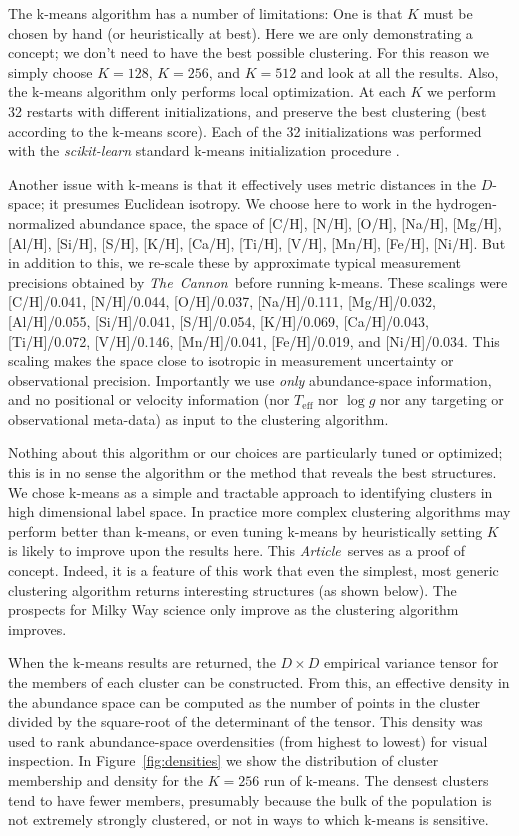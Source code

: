 \documentclass[manuscript, letterpaper]{aastex6}
\newcommand{\project}[1]{\textsl{#1}}
\newcommand{\thecannon}{\project{The~Cannon}}
\newcommand{\documentname}{\textsl{Article}}
\renewcommand{\figurename}{Figure} %
\newcommand{\teff}{T_{\mathrm{eff}}}
\newcommand{\logg}{\log g}
\begin{document}
The k-means algorithm has a number of limitations:
One is that $K$ must be chosen by hand (or heuristically at best).
Here we are only demonstrating a concept; we don't need to have the
best possible clustering.
For this reason we simply choose $K=128$, $K=256$, and $K=512$ and look at all the
results.
Also, the k-means algorithm only performs local optimization.
At each $K$ we perform 32 restarts with different initializations, and
preserve the best clustering (best according to the k-means score).
Each of the 32 initializations was performed with the
\project{scikit-learn} standard k-means initialization procedure
\citep{sklearn}.

Another issue with k-means is that it effectively uses metric
distances in the $D$-space; it presumes Euclidean isotropy.
We choose here to work in the hydrogen-normalized abundance space, the
space of [C/H], [N/H], [O/H], [Na/H], [Mg/H], [Al/H], [Si/H], [S/H],
[K/H], [Ca/H], [Ti/H], [V/H], [Mn/H], [Fe/H], [Ni/H].
But in addition to this, we re-scale these by approximate typical measurement
precisions obtained by \thecannon\ before running k-means.
These scalings were
  [C/H]/0.041,
  [N/H]/0.044,
  [O/H]/0.037,
  [Na/H]/0.111,
  [Mg/H]/0.032,
  [Al/H]/0.055,
  [Si/H]/0.041,
  [S/H]/0.054,
  [K/H]/0.069,
  [Ca/H]/0.043,
  [Ti/H]/0.072,
  [V/H]/0.146,
  [Mn/H]/0.041,
  [Fe/H]/0.019, and
  [Ni/H]/0.034.
This scaling makes the space close to isotropic in measurement uncertainty or
observational precision.
Importantly we use \emph{only} abundance-space information, and no
positional or velocity information (nor $\teff$ nor $\logg$ nor any
targeting or observational meta-data) as input to the clustering
algorithm.

Nothing about this algorithm or our choices are particularly
tuned or optimized; this is in no sense the
algorithm or the method that reveals the best structures.
We chose k-means as a simple and tractable approach to identifying
clusters in high dimensional label space. In practice more complex
clustering algorithms may perform better than k-means, or even
tuning k-means by heuristically setting $K$ is likely to improve
upon the results here. This \documentname\ serves as a proof of concept.
Indeed, it is a feature of this work that even the simplest, most
generic clustering algorithm returns interesting
structures (as shown below). 
The prospects for Milky Way science only improve as the clustering
algorithm improves.

When the k-means results are returned, the $D\times D$ empirical
variance tensor for the members of each cluster can be constructed.
From this, an effective density in the abundance space can be computed
as the number of points in the cluster divided by the square-root of
the determinant of the tensor.
This density was used to rank abundance-space overdensities (from highest
to lowest) for visual inspection.
In \figurename~\ref{fig:densities} we show the distribution of cluster membership
and density for the $K=256$ run of k-means.
The densest clusters tend to have fewer members, presumably because
the bulk of the population is not extremely strongly clustered, or not
in ways to which k-means is sensitive.
\end{document}
